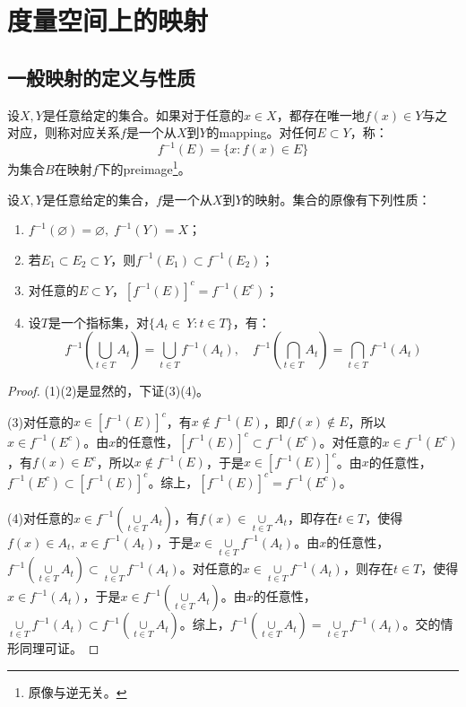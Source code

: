 \section{度量空间上的映射}
\subsection{一般映射的定义与性质}
\begin{definition}
	设$X,Y$是任意给定的集合。如果对于任意的$x\in X$，都存在唯一地$f(x)\in Y$与之对应，则称对应关系$f$是一个从$X$到$Y$的\gls{mapping}。对任何$E\subset Y$，称：
	\begin{equation*}
		f^{-1}(E)=\{x:f(x)\in E\}
	\end{equation*}
	为集合$B$在映射$f$下的\gls{preimage}\footnote{原像与逆无关。}。
\end{definition}
\begin{theorem}\label{theo:PropertyOfPreimage}
	设$X,Y$是任意给定的集合，$f$是一个从$X$到$Y$的映射。集合的原像有下列性质：
	\begin{enumerate}
		\item $f^{-1}(\varnothing)=\varnothing,\;f^{-1}(Y)=X$；
		\item 若$E_1\subset E_2\subset Y$，则$f^{-1}(E_1)\subset f^{-1}(E_2)$；
		\item 对任意的$E\subset Y$，$[f^{-1}(E)]^c=f^{-1}(E^c)$；
		\item 设$T$是一个指标集，对$\{A_t\in\ Y:t\in T\}$，有：
		\begin{equation*}
			f^{-1}\left(\underset{t\in T}{\bigcup}A_t\right)=\underset{t\in T}{\bigcup}f^{-1}(A_t), \quad
			f^{-1}\left(\underset{t\in T}{\bigcap}A_t\right)=\underset{t\in T}{\bigcap}f^{-1}(A_t)
		\end{equation*}
	\end{enumerate}
\end{theorem}
\begin{proof}
	(1)(2)是显然的，下证(3)(4)。\par
	(3)对任意的$x\in[f^{-1}(E)]^c$，有$x\notin f^{-1}(E)$，即$f(x)\notin E$，所以$x\in f^{-1}(E^c)$。由$x$的任意性，$[f^{-1}(E)]^c\subset f^{-1}(E^c)$。对任意的$x\in f^{-1}(E^c)$，有$f(x)\in E^c$，所以$x\notin f^{-1}(E)$，于是$x\in[f^{-1}(E)]^c$。由$x$的任意性，$f^{-1}(E^c)\subset[f^{-1}(E)]^c$。综上，$[f^{-1}(E)]^c=f^{-1}(E^c)$。\par
	(4)对任意的$x\in f^{-1}\left(\underset{t\in T}{\cup}A_t\right)$，有$f(x)\in\underset{t\in T}{\cup}A_t$，即存在$t\in T$，使得$f(x)\in A_t,\;x\in f^{-1}(A_t)$，于是$x\in\underset{t\in T}{\cup}f^{-1}(A_t)$。由$x$的任意性，$f^{-1}\left(\underset{t\in T}{\cup}A_t\right)\subset\underset{t\in T}{\cup}f^{-1}(A_t)$。对任意的$x\in\underset{t\in T}{\cup}f^{-1}(A_t)$，则存在$t\in T$，使得$x\in f^{-1}(A_t)$，于是$x\in f^{-1}\left(\underset{t\in T}{\cup}A_t\right)$。由$x$的任意性，$\underset{t\in T}{\cup}f^{-1}(A_t)\subset f^{-1}\left(\underset{t\in T}{\cup}A_t\right)$。综上，$f^{-1}\left(\underset{t\in T}{\cup}A_t\right)=\underset{t\in T}{\cup}f^{-1}(A_t)$。交的情形同理可证。
\end{proof}
